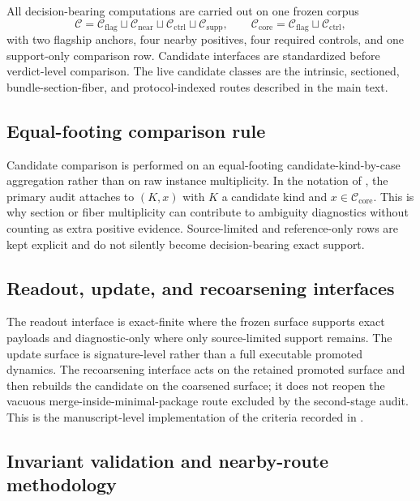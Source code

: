 \documentclass[11pt]{article}
\theoremstyle{definition}
\begin{document}
All decision-bearing computations are carried out on one frozen corpus
\[
\mathcal C
  = \mathcal C_{\mathrm{flag}}
    \sqcup \mathcal C_{\mathrm{near}}
    \sqcup \mathcal C_{\mathrm{ctrl}}
    \sqcup \mathcal C_{\mathrm{supp}},
\qquad
\mathcal C_{\mathrm{core}}
  = \mathcal C_{\mathrm{flag}}
    \sqcup \mathcal C_{\mathrm{ctrl}},
\]
with two flagship anchors, four nearby positives, four required controls, and one support-only comparison row. Candidate interfaces are standardized before verdict-level comparison. The live candidate classes are the intrinsic, sectioned, bundle-section-fiber, and protocol-indexed routes described in the main text.

\subsection*{Equal-footing comparison rule}

Candidate comparison is performed on an equal-footing candidate-kind-by-case aggregation rather than on raw instance multiplicity. In the notation of , the primary audit attaches to $(K,x)$ with $K$ a candidate kind and $x \in \mathcal C_{\mathrm{core}}$. This is why section or fiber multiplicity can contribute to ambiguity diagnostics without counting as extra positive evidence. Source-limited and reference-only rows are kept explicit and do not silently become decision-bearing exact support.

\subsection*{Readout, update, and recoarsening interfaces}

The readout interface is exact-finite where the frozen surface supports exact payloads and diagnostic-only where only source-limited support remains. The update surface is signature-level rather than a full executable promoted dynamics. The recoarsening interface acts on the retained promoted surface and then rebuilds the candidate on the coarsened surface; it does not reopen the vacuous merge-inside-minimal-package route excluded by the second-stage audit. This is the manuscript-level implementation of the criteria recorded in .

\subsection*{Invariant validation and nearby-route methodology}
\end{document}
